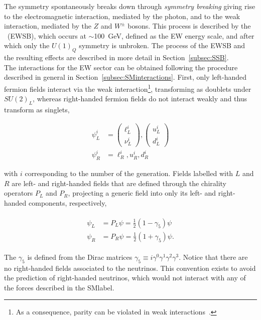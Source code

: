 The symmetry spontaneously breaks down through \textit{symmetry breaking} giving rise to the electromagnetic interaction,
mediated by the photon, and to the weak interaction, mediated by the $Z$ and $W^\pm$ bosons.
This process is described by the \textit{}~(\acrshort{EWSB}), which occurs at $\sim$100~GeV, defined as the \acrshort{EW} energy scale, and after which only the $U(1)_Q$ symmetry is unbroken. The process of the \acrshort{EWSB} and the resulting effects are described in
more detail in Section~\ref{subsec:SSB}.\\

The interactions for the \acrshort{EW} sector can be obtained following the procedure described in general in Section~\ref{subsec:SMinteractions}. First, only left-handed fermion fields interact via the weak
interaction\footnote{As a consequence, parity can be violated in weak interactions~\cite{Lee,Wu}.},
transforming as doublets under $SU(2)_L$, whereas right-handed fermion fields do not interact weakly and thus transform as singlets,

\begin{equation}
\begin{split}
    \psi_L^i &= \begin{pmatrix}\ell^i_L\\ \nu^i_L \end{pmatrix}, \begin{pmatrix} u^i_L \\ d^i_L \end{pmatrix}\\
    \psi_R^i &= \ell^i_R, u^i_R, d^i_R
\end{split}
\end{equation}

with $i$ corresponding to the number of the generation. Fields labelled with $L$ and $R$ are left- and right-handed fields that are defined through the chirality operators $P_L$ and $P_R$, projecting a generic field into only its left- and right-handed components, respectively,

\begin{align}
    \begin{split}
        \psi_L &= P_L\psi = \frac{1}{2}(1-\gamma_5)\psi\\
        \psi_R &= P_R\psi = \frac{1}{2}(1+\gamma_5)\psi.
    \end{split}
\end{align}

The $\gamma_5$ is defined from the Dirac matrices $\gamma_5\equiv i\gamma^0\gamma^1\gamma^2\gamma^3$. Notice that there are no right-handed fields associated to the neutrinos. This convention exists to avoid the prediction of right-handed neutrinos, which would not interact with any of the forces described in the \acrshort{SMlabel}.\\

